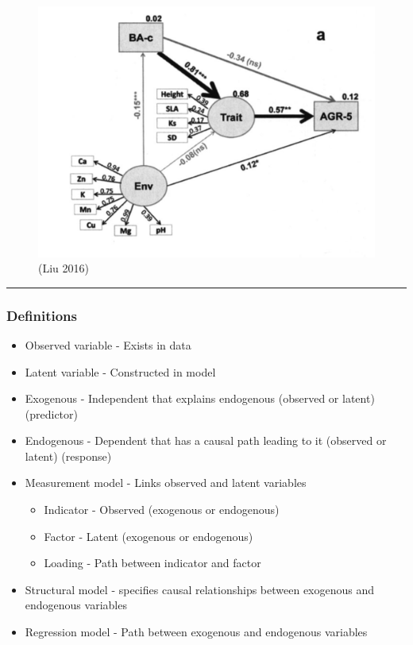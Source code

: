 \documentclass[
]{article}
\providecommand{\tightlist}{%
  \setlength{\itemsep}{0pt}\setlength{\parskip}{0pt}}
\begin{document}
\begin{figure}
\centering
\includegraphics{Liu2016SEM.png}
\caption{(Liu 2016)}
\end{figure}

\begin{center}\rule{0.5\linewidth}{0.5pt}\end{center}

\hypertarget{definitions}{%
\subsubsection{Definitions}\label{definitions}}

\begin{itemize}
\tightlist
\item
  Observed variable - Exists in data
\item
  Latent variable - Constructed in model
\item
  Exogenous - Independent that explains endogenous (observed or latent)
  (predictor)
\item
  Endogenous - Dependent that has a causal path leading to it (observed
  or latent) (response)
\item
  Measurement model - Links observed and latent variables

  \begin{itemize}
  \tightlist
  \item
    Indicator - Observed (exogenous or endogenous)
  \item
    Factor - Latent (exogenous or endogenous)
  \item
    Loading - Path between indicator and factor
  \end{itemize}
\item
  Structural model - specifies causal relationships between exogenous
  and endogenous variables
\item
  Regression model - Path between exogenous and endogenous variables
\end{itemize}
\end{document}
